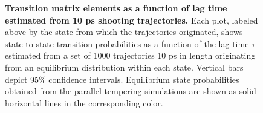 \begin{figure}[tb]
  \begin{center}
  \end{center}
  \caption{{\bf Transition matrix elements as a function of lag time estimated from 10 ps shooting trajectories.}  Each plot, labeled above by the state from which the trajectories originated, shows state-to-state transition probabilities as a function of the lag time $\tau$ estimated from a set of 1000 trajectories 10 ps in length originating from an equilibrium distribution within each state.  
   Vertical bars depict 95\% confidence intervals. 
   Equilibrium state probabilities obtained from the parallel tempering simulations are shown as solid horizontal lines in the corresponding color.}
  \label{long-times:figure:time-evolution-10ps}
\end{figure}	

